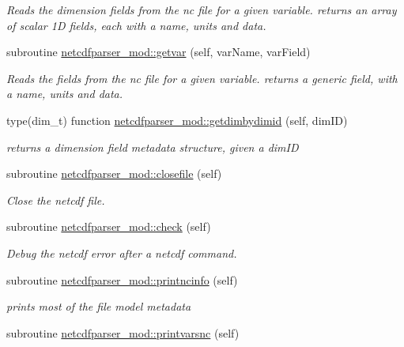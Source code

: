 \begin{DoxyCompactItemize}
\begin{DoxyCompactList}\small\item\em Reads the dimension fields from the nc file for a given variable. returns an array of scalar 1D fields, each with a name, units and data. \end{DoxyCompactList}\item 
subroutine \mbox{\hyperlink{namespacenetcdfparser__mod_a1f59a93ed593b1f4670d2c62fa9d5949}{netcdfparser\+\_\+mod\+::getvar}} (self, var\+Name, var\+Field)
\begin{DoxyCompactList}\small\item\em Reads the fields from the nc file for a given variable. returns a generic field, with a name, units and data. \end{DoxyCompactList}\item 
type(dim\+\_\+t) function \mbox{\hyperlink{namespacenetcdfparser__mod_a5fcd4b7fb27dbc9befd0a6fcfb9929a1}{netcdfparser\+\_\+mod\+::getdimbydimid}} (self, dim\+ID)
\begin{DoxyCompactList}\small\item\em returns a dimension field metadata structure, given a dim\+ID \end{DoxyCompactList}\item 
subroutine \mbox{\hyperlink{namespacenetcdfparser__mod_a518627511cac4bf3dbc338bf3bfd5e24}{netcdfparser\+\_\+mod\+::closefile}} (self)
\begin{DoxyCompactList}\small\item\em Close the netcdf file. \end{DoxyCompactList}\item 
subroutine \mbox{\hyperlink{namespacenetcdfparser__mod_ae1a034f6540ac7a1ce7d0e3831bb2f03}{netcdfparser\+\_\+mod\+::check}} (self)
\begin{DoxyCompactList}\small\item\em Debug the netcdf error after a netcdf command. \end{DoxyCompactList}\item 
subroutine \mbox{\hyperlink{namespacenetcdfparser__mod_aeb48d33c014bae21b2fceaaa70cbdc67}{netcdfparser\+\_\+mod\+::printncinfo}} (self)
\begin{DoxyCompactList}\small\item\em prints most of the file model metadata \end{DoxyCompactList}\item 
subroutine \mbox{\hyperlink{namespacenetcdfparser__mod_a6b57fa47d7bd796c75483216a51e5e04}{netcdfparser\+\_\+mod\+::printvarsnc}} (self)

\end{DoxyCompactItemize}
